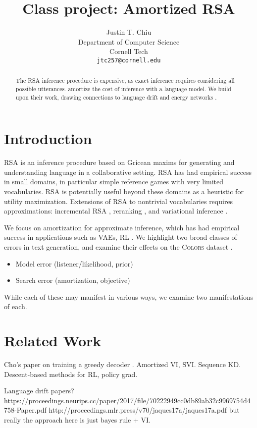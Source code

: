 \documentclass[11pt,a4paper]{article}
\title{Class project: Amortized RSA}
\author{Justin T. Chiu\\
  Department of Computer Science \\
  Cornell Tech \\
  \texttt{jtc257@cornell.edu}\\
}
\date{}
\begin{document}
\maketitle
\begin{abstract}
The RSA inference procedure is expensive,
as exact inference requires considering all possible utterances.
\citet{white2020learning} amortize the cost of inference with
a language model.
We build upon their work,
drawing connections to language drift \citep{}
and energy networks \citep{belanger2016structured}.
\end{abstract}

\section{Introduction}
RSA is an inference procedure based on Gricean maxims 
for generating and understanding language in a collaborative setting.
RSA has had empirical success in small domains, in particular simple reference games
with very limited vocabularies.
RSA is potentially useful beyond these domains as a heuristic for utility maximization.
Extensions of RSA to nontrivial vocabularies requires approximations:
incremental RSA \citep{}, reranking \citep{}, and variational inference \citep{white2020learning}.

We focus on amortization for approximate inference,
which has had empirical success in applications such as VAEs, RL
.
We highlight two broad classes of errors in text generation,
and examine their effects on the \textsc{Colors} dataset \citep{}.
\begin{itemize}
\item Model error (listener/likelihood, prior)
\item Search error (amortization, objective)
\end{itemize}
While each of these may manifest in various ways, we examine two manifestations of each.

\section{Related Work}
Cho's paper on training a greedy decoder \citep{gu2017trainable}.
Amortized VI, SVI.
Sequence KD.
Descent-based methods for RL, policy grad.

Language drift papers? 
https://proceedings.neurips.cc/paper/2017/file/70222949cc0db89ab32c9969754d4758-Paper.pdf
http://proceedings.mlr.press/v70/jaques17a/jaques17a.pdf
but really the approach here is just bayes rule + VI.
\end{document}
